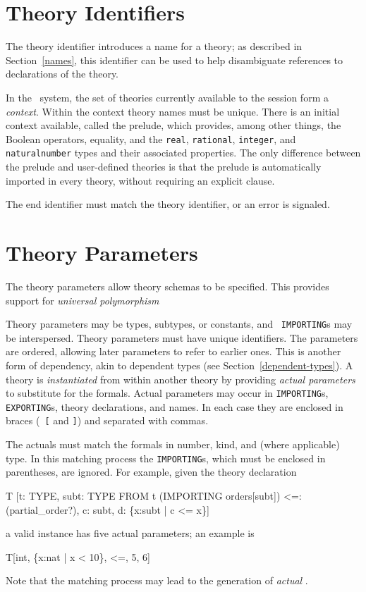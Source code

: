 
\section{Theory Identifiers}

The theory identifier introduces a name for a theory; as described in
Section~\ref{names}, this identifier can be used to help disambiguate
references to declarations of the theory.

In the \pvs\ system, the set of theories currently available to the
session form a {\em context\/}.  Within the context theory names must be
unique.  There is an initial context available, called the prelude,
which provides, among other things, the Boolean operators, equality, and
the {\tt real}, {\tt rational}, {\tt integer}, and {\tt naturalnumber}
types and their associated properties.  The only difference between the prelude and
user-defined theories is that the prelude is automatically imported in
every theory, without requiring an explicit  clause.

The end identifier must match the theory identifier, or an error is
signaled.


\section{Theory Parameters}\label{parameters}

The theory parameters allow theory schemas to be specified.  This
provides support for {\em universal polymorphism\/}

Theory parameters may be types, subtypes, or constants, and {\tt
IMPORTING}s may be interspersed.  Theory parameters must have unique
identifiers.  The parameters are ordered, allowing later parameters to
refer to earlier ones.  This is another form of dependency, akin to
dependent types (see Section~\ref{dependent-types}).  A theory is {\em
instantiated\/} from within another theory by providing {\em actual
parameters\/} to substitute for the formals.
Actual parameters may occur in {\tt IMPORTING}s, {\tt EXPORTING}s, theory
declarations, and names.  In each case they are enclosed in braces ({\tt
[} and {\tt ]}) and separated with commas.

The actuals must match the formals in number, kind, and (where
applicable) type.  In this matching process the {\tt IMPORTING}s, which
must be enclosed in parentheses, are ignored.  For example, given the
theory declaration
\begin{pvsex}
  T [t: TYPE,
     subt: TYPE FROM t
     (IMPORTING orders[subt]) <=: (partial_order?),
     c: subt,
     d: \{x:subt | c <= x\}]
\end{pvsex}
a valid instance has five actual parameters; an example is
\begin{pvsex}
  T[int, \{x:nat | x < 10\}, <=, 5, 6]
\end{pvsex}
%
Note that the matching process may lead to the generation of \emph{actual}
\tccs.

